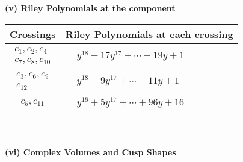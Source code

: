 \documentclass[1p]{elsarticle_modified}
\theoremstyle{definition}
\begin{document}
\newpage\renewcommand{\arraystretch}{1}
\flushleft \textbf{(v) Riley Polynomials at the component}\newline \\
\begin{tabular}{m{50pt}|m{274pt}}
Crossings & \hspace{64pt}Riley Polynomials at each crossing \\
\hline $$\begin{aligned}c_{1},c_{2},c_{4}\\c_{7},c_{8},c_{10}\end{aligned}$$&$\begin{aligned}
&y^{18}-17 y^{17}+\cdots-19 y+1
\end{aligned}$\\
\hline $$\begin{aligned}c_{3},c_{6},c_{9}\\c_{12}\end{aligned}$$&$\begin{aligned}
&y^{18}-9 y^{17}+\cdots-11 y+1
\end{aligned}$\\
\hline $$\begin{aligned}c_{5},c_{11}\end{aligned}$$&$\begin{aligned}
&y^{18}+5 y^{17}+\cdots+96 y+16
\end{aligned}$\\
\hline
\end{tabular}\\~\\
\newpage\flushleft \textbf{(vi) Complex Volumes and Cusp Shapes}
\end{document}

